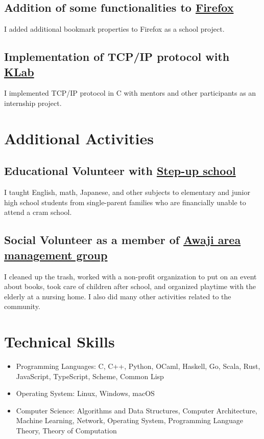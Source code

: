 \documentclass[12pt]{article}
\begin{document}
  \subsection*{Addition of some functionalities to \href{https://slides.com/diohabara/deck}{Firefox}}
    I added additional bookmark properties to Firefox as a school project.
  \subsection*{Implementation of TCP/IP protocol with \href{https://www.klab.com/en/}{KLab}}
    I implemented TCP/IP protocol in C with mentors and other participants as an internship project.

\section*{Additional Activities}
  \subsection*{Educational Volunteer with \href{https://stepup-unesco.com/}{Step-up school}}
    I taught English, math, Japanese, and other subjects to elementary and junior high school students from single-parent families who are financially unable to attend a cram school.
  \subsection*{Social Volunteer as a member of \href{https://www.waterras.com/awaji_am.html}{Awaji area management group}}
    I cleaned up the trash, worked with a non-profit organization to put on an event about books, took care of children after school, and organized playtime with the elderly at a nursing home.
    I also did many other activities related to the community.

\section*{Technical Skills}
    \begin{itemize}
      \item Programming Languages:
        C,
        C++,
        Python,
        OCaml,
        Haskell,
        Go,
        Scala,
        Rust,
        JavaScript,
        TypeScript,
        Scheme,
        Common Lisp
      \item Operating System:
        Linux,
        Windows,
        macOS
      \item Computer Science:
        Algorithms and Data Structures,
        Computer Architecture,
        Machine Learning,
        Network,
        Operating System,
        Programming Language Theory,
        Theory of Computation
    \end{itemize}
\end{document}
